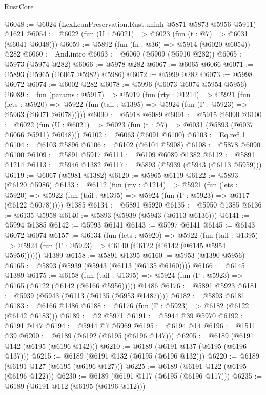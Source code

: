 \begin{lexlean}{RustCore}
\begin{coremodule}
@6048 := @6024 (LexLeanPreservation.Rust.uninh @5871 @5873 @5956 @5911) @1621
@6054 := @6022 (fun (U : @6021) => @6023 (fun (t : @7) => @6031 (@6041 @6048)))
@6059 := @5892 (fun (fn : @36) => @5914 (@6020 @6054)) @282
@6060 := And.intro
@6063 := @6060 (@5909 (@5910 @282))
@6065 := @5973 (@5974 @282)
@6066 := @5978 @282
@6067 := @6065 @6066
@6071 := @5893 (@5965 (@6067 @5982) @5986)
@6072 := @5999 @282
@6073 := @5998 @6072
@6074 := @6002 @282
@6078 := @5996 (@6073 @6074 @5954 @5956)
@6089 := fun (params : @5917) =>
  @5919
    (fun (rty : @1214) =>
    @5921
      (fun (lets : @5920) =>
      @5922 (fun (tail : @1395) => @5924 (fun (Γ : @5923) => @5963 (@6071 @6078)))))
@6090 := @5918 @6089
@6091 := @5915 @6090
@6100 := @6022 (fun (U : @6021) => @6023 (fun (t : @7) => @6031 (@5893 (@6037 @6066 @5911) @6048)))
@6102 := @6063 (@6091 @6100)
@6103 := Eq.refl.{1}
@6104 := @6103 @5896
@6106 := @6102 (@6104 @5908)
@6108 := @5878 @6090 @6100
@6109 := @5891 @5917
@6111 := @6109 @6089 @1382
@6112 := @5891 @1214
@6113 := @5946 @1382
@6117 := @5893 (@5939 (@5943 (@6113 @5959)))
@6119 := @6067 (@5981 @1382)
@6120 := @5965 @6119
@6122 := @5893 (@6120 @5986)
@6133 := @6112
    (fun (rty : @1214) =>
    @5921
      (fun (lets : @5920) =>
      @5922 (fun (tail : @1395) => @5924 (fun (Γ : @5923) => @6117 (@6122 @6078)))))
    @1385
@6134 := @5891 @5920
@6135 := @5950 @1385
@6136 := @6135 @5958
@6140 := @5893 (@5939 (@5943 (@6113 @6136)))
@6141 := @5994 @1385
@6142 := @5993 @6141
@6143 := @5997 @6141
@6145 := @6143 @6072 @6074
@6157 := @6134
    (fun (lets : @5920) =>
    @5922
      (fun (tail : @1395) => @5924 (fun (Γ : @5923) => @6140 (@6122 (@6142 (@6145 @5954 @5956))))))
    @1389
@6158 := @5891 @1395
@6160 := @5953 (@1390 @5956)
@6165 := @5893 (@5939 (@5943 (@6113 (@6135 @6160))))
@6166 := @6145 @1389
@6175 := @6158
    (fun (tail : @1395) => @5924 (fun (Γ : @5923) => @6165 (@6122 (@6142 (@6166 @5956)))))
    @1486
@6176 := @5891 @5923
@6181 := @5939 (@5943 (@6113 (@6135 (@5953 @1487))))
@6182 := @5893 @6181
@6183 := @6166 @1486
@6188 := @6176 (fun (Γ : @5923) => @6182 (@6122 (@6142 @6183)))
@6189 := @2 @5971
@6191 := @5944 @39 @5970
@6192 := @6191 @147
@6194 := @5944 @7 @5969
@6195 := @6194 @14
@6196 := @1511 @39
@6200 := @6189 (@6192 (@6195 (@6196 @147)))
@6205 := @6189 (@6191 @142 (@6195 (@6196 @142)))
@6210 := @6189 (@6191 @137 (@6195 (@6196 @137)))
@6215 := @6189 (@6191 @132 (@6195 (@6196 @132)))
@6220 := @6189 (@6191 @127 (@6195 (@6196 @127)))
@6225 := @6189 (@6191 @122 (@6195 (@6196 @122)))
@6230 := @6189 (@6191 @117 (@6195 (@6196 @117)))
@6235 := @6189 (@6191 @112 (@6195 (@6196 @112)))

\end{coremodule}
\end{lexlean}
